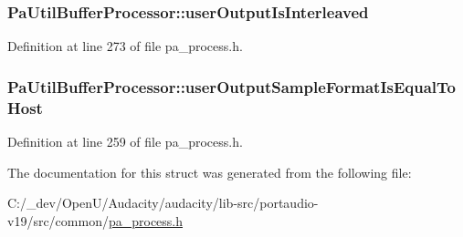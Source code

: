 \subsubsection[{\texorpdfstring{user\+Output\+Is\+Interleaved}{userOutputIsInterleaved}}]{ Pa\+Util\+Buffer\+Processor\+::user\+Output\+Is\+Interleaved}\hypertarget{struct_pa_util_buffer_processor_a3be95f50566a88ebdc2697cde95d042e}{}\label{struct_pa_util_buffer_processor_a3be95f50566a88ebdc2697cde95d042e}


Definition at line 273 of file pa\+\_\+process.\+h.

\subsubsection[{\texorpdfstring{user\+Output\+Sample\+Format\+Is\+Equal\+To\+Host}{userOutputSampleFormatIsEqualToHost}}]{ Pa\+Util\+Buffer\+Processor\+::user\+Output\+Sample\+Format\+Is\+Equal\+To\+Host}\hypertarget{struct_pa_util_buffer_processor_ad791f8650ed327dc106a6f97c3ec5799}{}\label{struct_pa_util_buffer_processor_ad791f8650ed327dc106a6f97c3ec5799}


Definition at line 259 of file pa\+\_\+process.\+h.



The documentation for this struct was generated from the following file\+:\begin{DoxyCompactItemize}
\item 
C\+:/\+\_\+dev/\+Open\+U/\+Audacity/audacity/lib-\/src/portaudio-\/v19/src/common/\hyperlink{pa__process_8h}{pa\+\_\+process.\+h}\end{DoxyCompactItemize}
